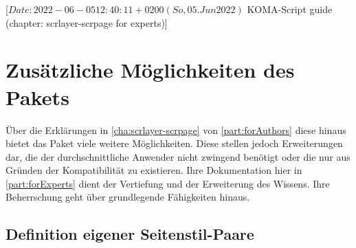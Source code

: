 %
%
%
%
%
%
%

%
                 [$Date: 2022-06-05 12:40:11 +0200 (So, 05. Jun 2022) $
                  KOMA-Script guide (chapter: scrlayer-scrpage for experts)]

\chapter[{Zusätzliche Möglichkeiten von \Package{scrlayer-scrpage}}]
{Zusätzliche Möglichkeiten des
  Pakets
  }
%
\BeginIndexGroup
{}%
Über die Erklärungen in \autoref{cha:scrlayer-scrpage} von
\autoref{part:forAuthors} diese hinaus bietet
das Paket  viele weitere Möglichkeiten. Diese
stellen jedoch Erweiterungen dar, die der durchschnittliche Anwender
nicht zwingend benötigt oder die nur aus Gründen der Kompatibilität zu
 existieren. Ihre Dokumentation hier in
\autoref{part:forExperts} dient der Vertiefung und der Erweiterung des
Wissens. Ihre Beherrschung geht über grundlegende Fähigkeiten hinaus.


\section{Definition eigener Seitenstil-Paare}

